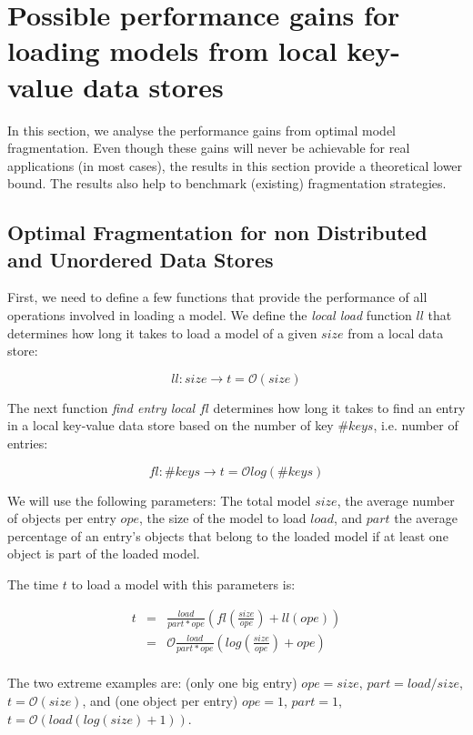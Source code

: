 \section{Possible performance gains for loading models from local key-value data stores}

In this section, we analyse the performance gains from optimal model fragmentation. Even though these gains will never be achievable for real applications (in most cases), the results in this section provide a theoretical lower bound. The results also help to benchmark (existing) fragmentation strategies. 

\subsection{Optimal Fragmentation for non Distributed and Unordered Data Stores}

First, we need to define a few functions that provide the performance of all operations involved in loading a model. We define the \emph{local load} function $ll$ that determines how long it takes to load a model of a given $size$  from a local data store:

$$ll:size\rightarrow t=\mathcal{O}\left(size\right)$$

The next function \emph{find entry local} $fl$ determines how long it takes to find an entry in a local key-value data store based on the number of key $\#keys$, i.e. number of entries:

$$fl:\#keys\rightarrow t=\mathcal{O}log(\#keys)$$

We will use the following parameters: The total model $size$, the average number of objects per entry $ope$, the size of the model to load $load$, and $part$ the average percentage of an entry's objects that belong to the loaded model if at least one object is part of the loaded model.

The time $t$ to load a model with this parameters is:

\begin{eqnarray*}
t&=&\frac{load}{part*ope}\left(fl(\frac{size}{ope}) + ll(ope)\right)\\
&=&\mathcal{O}\frac{load}{part*ope}\left(log(\frac{size}{ope})+ope\right)\\
\end{eqnarray*}

The two extreme examples are: (only one big entry) $ope=size$, $part=load/size$, $t=\mathcal{O}\left(size\right)$, and (one object per entry) $ope=1$, $part=1$, $t=\mathcal{O}\left(load\left(log(size)+1\right)\right)$. 

